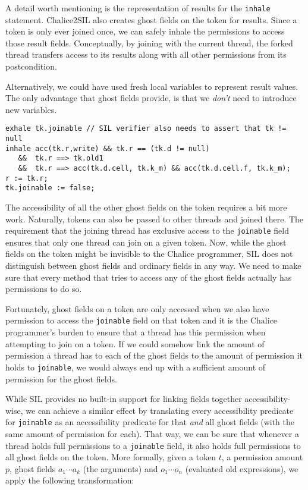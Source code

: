 A detail worth mentioning is the representation of results for the \lstinline!inhale! statement. 
Chalice2SIL also creates ghost fields on the token for results. 
Since a token is only ever joined once, we can safely inhale the permissions to access those result fields. 
Conceptually, by joining with the current thread, the forked thread transfers access to its results along with all other permissions from its postcondition.

Alternatively, we could have used fresh local variables to represent result values. The only advantage that ghost fields provide, is that we \emph{don't} need to introduce new variables.

\begin{lstlisting}[float,caption={Translation of the \lstinline!join! statement on line 24 in listing \ref{lst:fjexample}.},label=lst:fjexamplejoin,language=sil]
exhale tk.joinable // SIL verifier also needs to assert that tk != null
inhale acc(tk.r,write) && tk.r == (tk.d != null)
   &&  tk.r ==> tk.old1
   &&  tk.r ==> acc(tk.d.cell, tk.k_m) && acc(tk.d.cell.f, tk.k_m);
r := tk.r;
tk.joinable := false;
\end{lstlisting}

The accessibility of all the other ghost fields on the token requires a bit more work. 
Naturally, tokens can also be passed to other threads and joined there. 
The requirement that the joining thread has exclusive access to the \lstinline!joinable! field ensures that only one thread can join on a given token. 
Now, while the ghost fields on the token might be invisible to the Chalice programmer, SIL does not distinguish between ghost fields and ordinary fields in any way.
We need to make sure that every method that tries to access any of the ghost fields actually has permissions to do so.

Fortunately, ghost fields on a token are only accessed when we also have permission to access the \lstinline!joinable! field on that token and it is the Chalice programmer's burden to ensure that a thread has this permission when attempting to join on a token. 
If we could somehow link the amount of permission a thread has to each of the ghost fields to the amount of permission it holds to \lstinline!joinable!, we would always end up with a sufficient amount of permission for the ghost fields.

While SIL provides no built-in support for linking fields together accessibility-wise, we can achieve a similar effect by translating every accessibility predicate for \lstinline!joinable! as an accessibility predicate for that \emph{and} all ghost fields (with the same amount of permission for each). That way, we can be sure that whenever a thread holds full permissions to a \lstinline!joinable! field, it also holds full permissions to all ghost fields on the token. More formally, given a token $t$, a permission amount $p$, ghost fields $a_1 \cdots a_k$ (the arguments) and $o_1 \cdots o_n$ (evaluated old expressions), we apply the following transformation:

